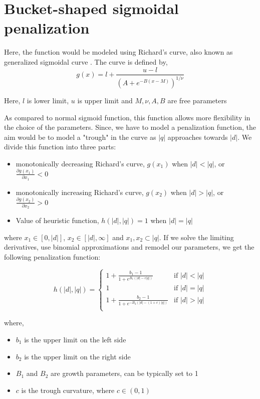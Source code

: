 \section{Bucket-shaped sigmoidal penalization} 

Here, the function would be modeled using Richard's curve, also known as generalized sigmoidal curve \cite{birch1999new}. 
The curve is defined by,
\begin{equation}
	g(x) = l + \frac{u - l}{(A + e^{{-B(x-M)}})^{{1/\nu }}}
\end{equation}

Here, $l$ is lower limit, $u$ is upper limit and $M, \nu, A, B$ are free parameters

As compared to normal sigmoid function, this function allows more flexibility in the choice of the parameters.
Since, we have to model a penalization function, the aim would be to model a "trough" in the curve as $|q|$ approaches towards $|d|$. 
We divide this function into three parts:

\begin{itemize}
	\item monotonically decreasing Richard's curve, $g(x_1)$  when $|d| < |q|$, or $\frac{\partial g(x_1)}{\partial x_1} < 0$
	\item monotonically increasing Richard's curve, $g(x_2)$ when $|d| > |q|$, or $\frac{\partial g(x_2)}{\partial x_2} > 0$
	\item Value of heuristic function, $h(|d|, |q|) = 1$  when $|d| = |q|$
\end{itemize}

where $x_1 \in [0, |d|]$, $x_2 \in [|d|, \infty]$ and $x_1, x_2 \subset |q|$. If we solve the limiting derivatives, use binomial approximations and remodel our parameters, we get the following penalization function:

\begin{equation}
	h(|d|, |q|) = 
	\begin{cases}
		1 + \frac{b_1 - 1}{1 + e^{B_1(|d| - c|q|)}}       & \text{if } |d| < |q|\\
		1 &  \text{if } |d| = |q|\\
		1 + \frac{b_2 - 1}{1 + e^{-B_2(|d| - (1 + c)|q|)}}  &  \text{if } |d| > |q|\\
	\end{cases}
\end{equation}

where, 

\begin{itemize}
	\item $b_1$ is the upper limit on the left side
	\item $b_2$ is the upper limit on the right side
	\item $B_1$ and $B_2$ are growth parameters, can be typically set to 1
	\item $c$ is the trough curvature, where $c \in (0, 1)$
\end{itemize}

